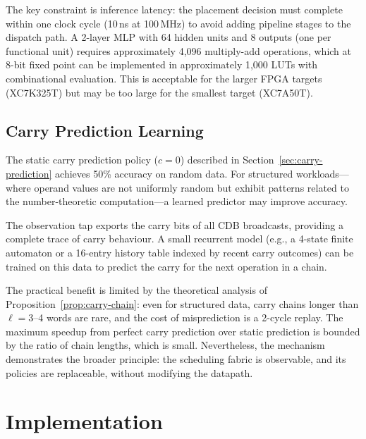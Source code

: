 \documentclass[11pt,a4paper]{article}
\begin{document}
The key constraint is inference latency: the placement decision must
complete within one clock cycle (10\,ns at 100\,MHz) to avoid adding
pipeline stages to the dispatch path.  A 2-layer MLP with 64 hidden units
and 8 outputs (one per functional unit) requires approximately 4,096 multiply-add
operations, which at 8-bit fixed point can be implemented in approximately
1,000 LUTs with combinational evaluation.  This is acceptable for the
larger FPGA targets (XC7K325T) but may be too large for the smallest target
(XC7A50T).

\subsection{Carry Prediction Learning}
\label{sec:carry-prediction-learning}

The static carry prediction policy ($c = 0$) described in
Section~\ref{sec:carry-prediction} achieves 50\% accuracy on random data.
For structured workloads---where operand values are not uniformly random
but exhibit patterns related to the number-theoretic computation---a learned
predictor may improve accuracy.

The observation tap exports the carry bits of all CDB broadcasts, providing
a complete trace of carry behaviour.  A small recurrent model (e.g., a
4-state finite automaton or a 16-entry history table indexed by recent carry
outcomes) can be trained on this data to predict the carry for the next
operation in a chain.

The practical benefit is limited by the theoretical analysis of
Proposition~\ref{prop:carry-chain}: even for structured data, carry chains
longer than $\ell = 3$--4 words are rare, and the cost of misprediction is
a 2-cycle replay.  The maximum speedup from perfect carry prediction over
static prediction is bounded by the ratio of chain lengths, which is small.
Nevertheless, the mechanism demonstrates the broader principle: the
scheduling fabric is observable, and its policies are replaceable, without
modifying the datapath.


\section{Implementation}
\label{sec:implementation}
\end{document}
